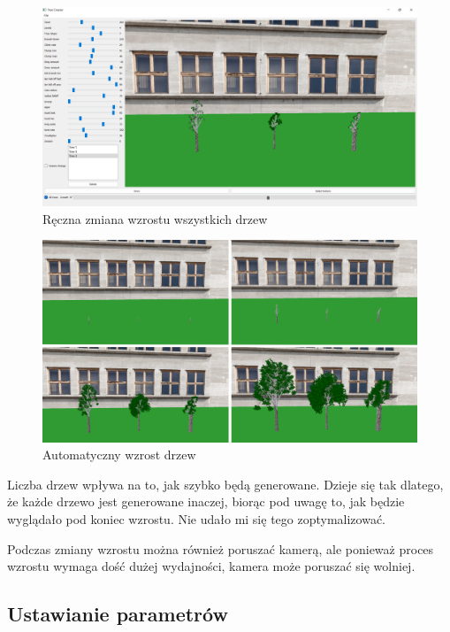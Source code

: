 \documentclass[a4paper,twoside,12pt]{report}
\begin{document}
\begin{figure}[H]
	\centering\includegraphics[width=15.5cm]{grafika/program/percentGrow.png}
	\caption{Ręczna zmiana wzrostu wszystkich drzew}
    \label{fig:percentGrow}
\end{figure}


\begin{figure}[H]
	\centering\includegraphics[width=15.5cm]{grafika/program/AllGrow.png}
	\caption{Automatyczny wzrost drzew}
    \label{fig:growAll}
\end{figure}

Liczba drzew wpływa na to, jak szybko będą generowane. 
Dzieje się tak dlatego, że każde drzewo jest generowane inaczej, 
biorąc pod uwagę to, jak będzie wyglądało pod koniec wzrostu.
Nie udało mi się tego zoptymalizować.

Podczas zmiany wzrostu można również poruszać kamerą, 
ale ponieważ proces wzrostu wymaga dość dużej wydajności, 
kamera może poruszać się wolniej.

\subsection{Ustawianie parametrów}
\end{document}
